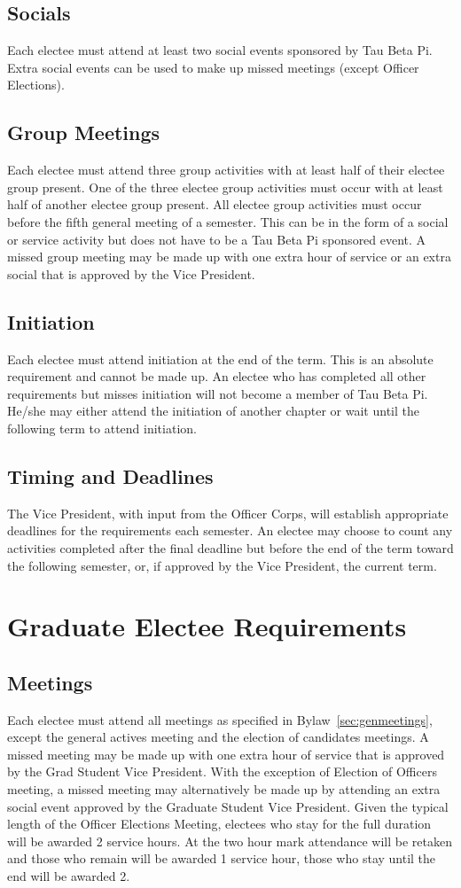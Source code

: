 \section{Socials} Each electee must attend at least two social events sponsored by Tau Beta Pi. Extra social  events can be used to make up missed meetings (except Officer Elections).
\section{Group Meetings} \label{group_meetings} Each electee must attend three group activities with at least half of their electee group present. One of the three electee group activities must occur with at least half of another electee group present. All electee group activities must occur before the fifth general meeting of a semester.  This can be in the form of a social or service activity but does not have to be a Tau Beta Pi sponsored event. A missed group meeting may be made up with one extra hour of service or an extra social that is approved by the Vice President.
\section{Initiation} Each electee must attend initiation at the end of the term. This is an absolute requirement and cannot be made up. An electee who has completed all other requirements but misses initiation will not become a member of Tau Beta Pi. He/she may either attend the initiation of another chapter or wait until the following term to attend initiation.
\section{Timing and Deadlines}  The Vice President, with input from the Officer Corps, will establish appropriate deadlines for the requirements each semester. An electee may choose to count any activities completed after the final deadline but before the end of the term toward the following semester, or, if approved by the Vice President, the current term.

\chapter{Graduate Electee Requirements}\label{sec:gradreqs}%
\section{Meetings} Each electee must attend all meetings as specified in Bylaw~\ref{sec:genmeetings}, except the general actives meeting and the election of candidates  meetings. A missed meeting may be made up with one extra hour of service that is approved by the Grad Student Vice President. 
With the exception of Election of Officers meeting, a missed meeting may alternatively be made up by attending an extra social event approved by the Graduate Student Vice President. Given the typical length of the Officer Elections Meeting, electees who stay for the full duration will be awarded 2 service hours. At the two hour mark attendance will be retaken and those who remain will be awarded 1 service hour, those who stay until the end will be awarded 2.
